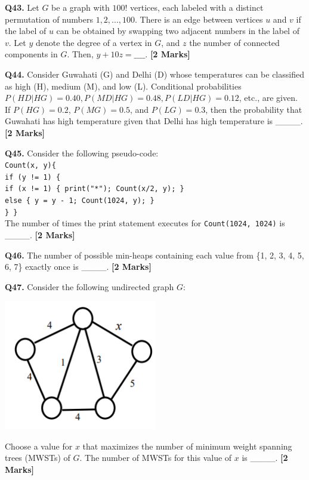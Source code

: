 \documentclass[11pt]{article}
\newcommand{\questionb}[2]{
    \noindent\textbf{Q#2.} #1 \hfill \textbf{[2 Marks]}
}
\begin{document}
\questionb{Let \( G \) be a graph with \( 100! \) vertices, each labeled with a distinct permutation of numbers \( 1, 2, ..., 100 \). There is an edge between vertices \( u \) and \( v \) if the label of \( u \) can be obtained by swapping two adjacent numbers in the label of \( v \). Let \( y \) denote the degree of a vertex in \( G \), and \( z \) the number of connected components in \( G \). Then, \( y + 10z = \_\_\_\_. \)}{43}
\vspace{0.5cm}

\questionb{Consider Guwahati (G) and Delhi (D) whose temperatures can be classified as high (H), medium (M), and low (L). Conditional probabilities \( P(HD|HG) = 0.40, P(MD|HG) = 0.48, P(LD|HG) = 0.12 \), etc., are given. If \( P(HG) = 0.2 \), \( P(MG) = 0.5 \), and \( P(LG) = 0.3 \), then the probability that Guwahati has high temperature given that Delhi has high temperature is \_\_\_\_.}{44}
\vspace{0.5cm}

\questionb{Consider the following pseudo-code:\\
\texttt{Count(x, y)\{\\
\hspace{0.5cm}if (y != 1) \{\\
\hspace{1cm}if (x != 1) \{ print("*"); Count(x/2, y); \}\\
\hspace{1cm}else \{ y = y - 1; Count(1024, y); \}\\
\hspace{0.5cm} \} \}}\\
The number of times the print statement executes for \texttt{Count(1024, 1024)} is \_\_\_\_.}{45}
\vspace{0.5cm}

\questionb{The number of possible min-heaps containing each value from \{1, 2, 3, 4, 5, 6, 7\} exactly once is \_\_\_\_.}{46}
\vspace{0.5cm}

\questionb{Consider the following undirected graph \( G \):\\
\begin{center}
\includegraphics[width=0.5\textwidth]{figures/47}
\end{center}
Choose a value for \( x \) that maximizes the number of minimum weight spanning trees (MWSTs) of \( G \). The number of MWSTs for this value of \( x \) is \_\_\_\_.}{47}
\vspace{0.5cm}
\end{document}
